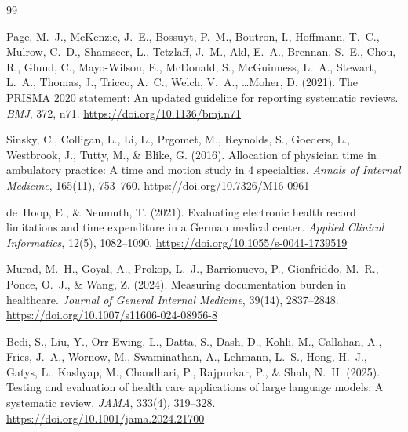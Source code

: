 \documentclass[CAT]{TFUOC}%
\begin{document}
\begin{thebibliography}{99}


Page, M.~J., McKenzie, J.~E., Bossuyt, P.~M., Boutron, I., Hoffmann, T.~C., Mulrow, C.~D., Shamseer, L., Tetzlaff, J.~M.,
Akl, E.~A., Brennan, S.~E., Chou, R., Gluud, C., Mayo-Wilson, E., McDonald, S., McGuinness, L.~A., Stewart, L.~A., Thomas, J.,
Tricco, A.~C., Welch, V.~A., \ldots Moher, D. (2021).
\newblock The PRISMA 2020 statement: An updated guideline for reporting systematic reviews.
\newblock \textit{BMJ}, 372, n71.
\newblock \url{https://doi.org/10.1136/bmj.n71}



Sinsky, C., Colligan, L., Li, L., Prgomet, M., Reynolds, S., Goeders, L., Westbrook, J., Tutty, M., \& Blike, G. (2016).
\newblock Allocation of physician time in ambulatory practice: A time and motion study in 4 specialties.
\newblock \textit{Annals of Internal Medicine}, 165(11), 753--760.
\newblock \url{https://doi.org/10.7326/M16-0961}

de~Hoop, E., \& Neumuth, T. (2021).
\newblock Evaluating electronic health record limitations and time expenditure in a German medical center.
\newblock \textit{Applied Clinical Informatics}, 12(5), 1082--1090.
\newblock \url{https://doi.org/10.1055/s-0041-1739519}

Murad, M.~H., Goyal, A., Prokop, L.~J., Barrionuevo, P.,
Gionfriddo, M.~R., Ponce, O.~J., \& Wang, Z. (2024).
\newblock Measuring documentation burden in healthcare.
\newblock \textit{Journal of General Internal Medicine},
39(14), 2837--2848.
\newblock \url{https://doi.org/10.1007/s11606-024-08956-8}


Bedi, S., Liu, Y., Orr-Ewing, L., Datta, S., Dash, D.,
Kohli, M., Callahan, A., Fries, J.~A., Wornow, M.,
Swaminathan, A., Lehmann, L.~S., Hong, H.~J., Gatys, L.,
Kashyap, M., Chaudhari, P., Rajpurkar, P., \& Shah, N.~H.
(2025).
\newblock Testing and evaluation of health care applications
of large language models: A systematic review.
\newblock \textit{JAMA}, 333(4), 319--328.
\newblock \url{https://doi.org/10.1001/jama.2024.21700}


\end{thebibliography}
\end{document}
